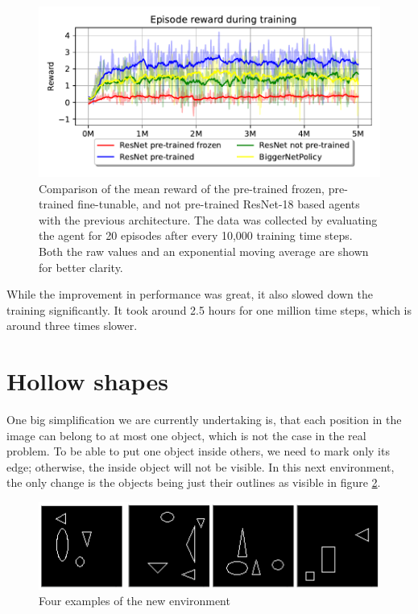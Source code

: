 \documentclass[
  digital,     %
  oneside,     %
  nosansbold,  %
  nocolorbold, %
  lof,         %
  lot,         %
]{fithesis4}
\begin{document}
\begin{figure}
    \includegraphics[width=1\linewidth]{graphs/v4_resnet_graph.pdf}
    \caption{Comparison of the mean reward of the pre-trained frozen, pre-trained fine-tunable, and not pre-trained ResNet-18 based agents with the previous architecture. The data was collected by evaluating the agent for 20 episodes after every 10,000 training time steps. Both the raw values and an exponential moving average are shown for better clarity.}
    \label{fig:v4_resnet_graph}
\end{figure}

While the improvement in performance was great, it also slowed down the training significantly. It took around 2.5 hours for one million time steps, which is around three times slower.

\section{Hollow shapes}
One big simplification we are currently undertaking is, that each position in the image can belong to at most one object, which is not the case in the real problem. To be able to put one object inside others, we need to mark only its edge; otherwise, the inside object will not be visible. In this next environment, the only change is the objects being just their outlines as visible in figure \ref{fig:env5}.

\begin{figure}
    \centering
    \includegraphics[width=1\linewidth]{env_examples/env5.png}
    \caption{Four examples of the new environment}
    \label{fig:env5}
\end{figure}
 
\end{document}
